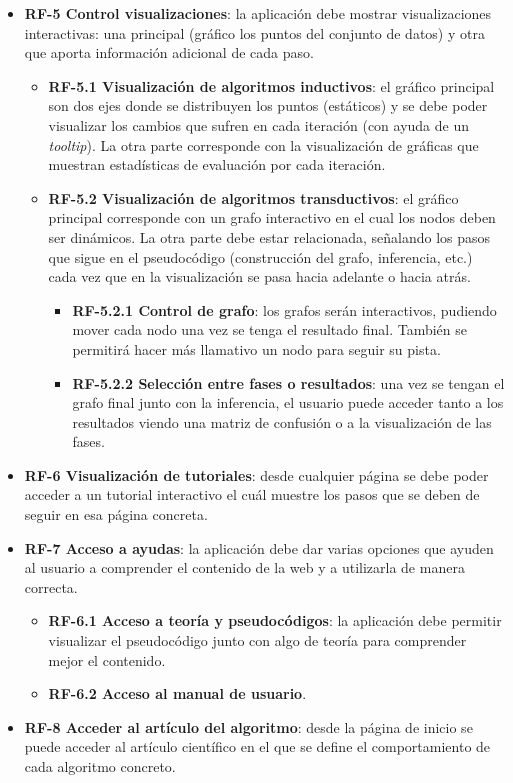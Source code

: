 \begin{itemize}
\begin{itemize}
	\end{itemize} 
	\item \textbf{RF-5 Control visualizaciones}: la aplicación debe mostrar visualizaciones interactivas: una principal (gráfico los puntos del conjunto de datos) y otra que aporta información adicional de cada paso.
	\begin{itemize}
		\item \textbf{RF-5.1 Visualización de algoritmos inductivos}: el gráfico principal son dos ejes donde se distribuyen los puntos (estáticos) y se debe poder visualizar los cambios que sufren en cada iteración (con ayuda de un \textit{tooltip}). La otra parte corresponde con la visualización de gráficas que muestran estadísticas de evaluación por cada iteración.
		\item \textbf{RF-5.2 Visualización de algoritmos transductivos}: el gráfico principal corresponde con un grafo interactivo en el cual los nodos deben ser dinámicos. La otra parte debe estar relacionada, señalando los pasos que sigue en el pseudocódigo (construcción del grafo, inferencia, etc.) cada vez que en la visualización se pasa hacia adelante o hacia atrás.
		\begin{itemize}
			\item \textbf{RF-5.2.1 Control de grafo}: los grafos serán interactivos, pudiendo mover cada nodo una vez se tenga el resultado final. También se permitirá hacer más llamativo un nodo para seguir su pista.
			\item \textbf{RF-5.2.2 Selección entre fases o resultados}: una vez se tengan el grafo final junto con la inferencia, el usuario puede acceder tanto a los resultados viendo una matriz de confusión o a la visualización de las fases.
		\end{itemize}
	\end{itemize}
	\item \textbf{RF-6 Visualización de tutoriales}: desde cualquier página se debe poder acceder a un tutorial interactivo el cuál muestre los pasos que se deben de seguir en esa página concreta.
	\item \textbf{RF-7 Acceso a ayudas}: la aplicación debe dar varias opciones que ayuden al usuario a comprender el contenido de la web y a utilizarla de manera correcta.
	\begin{itemize}
		\item \textbf{RF-6.1 Acceso a teoría y pseudocódigos}: la aplicación debe permitir visualizar el pseudocódigo junto con algo de teoría para comprender mejor el contenido.
		\item \textbf{RF-6.2 Acceso al manual de usuario}.
	\end{itemize}
	\item \textbf{RF-8 Acceder al artículo del algoritmo}: desde la página de inicio se puede acceder al artículo científico en el que se define el comportamiento de cada algoritmo concreto.
\end{itemize}

